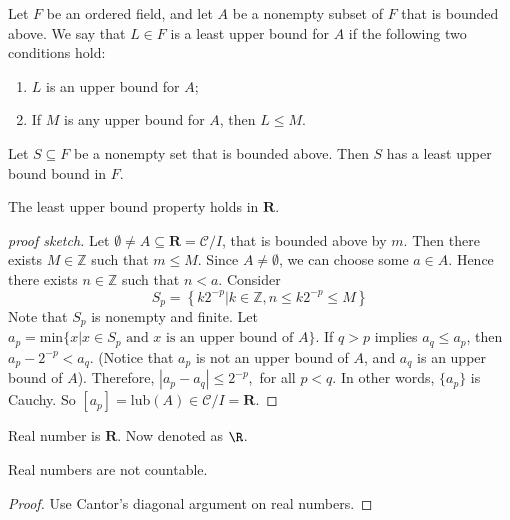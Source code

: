 \documentclass[10pt]{article}
\begin{document}

\begin{definition}
    Let $F$ be an ordered field, and let $A$ be a nonempty subset of $F$ that is bounded above. We say that $L\in F$ is a least upper bound for $A$ if the following two conditions hold:
    \begin{enumerate}
        \item $L$ is an upper bound for $A$;
        \item If $M$ is any upper bound for $A$, then $L\leq M$.
    \end{enumerate}
\end{definition}
\begin{definition}
    Let $S\subseteq F$ be a nonempty set that is bounded above. Then $S$ has a least upper bound bound in $F$.  
\end{definition}
\begin{proposition}
    The least upper bound property holds in $\mathbf{R}$.
\end{proposition}
\begin{proof}[proof sketch]
    Let $\emptyset\neq A\subseteq\mathbf{R}=\mathcal{C}/{I}$, that is bounded above by $m$. Then there exists $ M\in\mathbb{Z}$ such that $m\leq M$. Since $A\neq\emptyset$, we can choose some $a\in A$. Hence there exists $ n\in\mathbb{Z}$ such that $n<a$. Consider 
    $$
        S_p=\left\{k2^{-p}\big|k\in\mathbb{Z},n\leq k2^{-p}\leq M\right\}
    $$
    Note that $S_p$ is nonempty and finite. Let $a_p=\text{min}\{x|x\in S_p \text{ and } x\text{ is an upper bound of } A\}$. If $q>p$ implies $a_q\leq a_p$, then $a_p-2^{-p}<a_q$. (Notice that $a_p$ is not an upper bound of $A$, and $a_q$ is an upper bound of $A$). Therefore, $|a_p-a_q|\leq 2^{-p}$,\ for all $p<q$. In other words, $\{a_p\}$ is Cauchy. So $[a_p]=$lub$(A)\in\mathcal{C}/{I}=\mathbf{R}$.
\end{proof}
\begin{definition}
    Real number is $\mathbf{R}$. Now denoted as $\R$.
\end{definition}
\begin{proposition}
    Real numbers are not countable.
\end{proposition}
\begin{proof}
    Use Cantor's diagonal argument on real numbers.
\end{proof}
\end{document}
